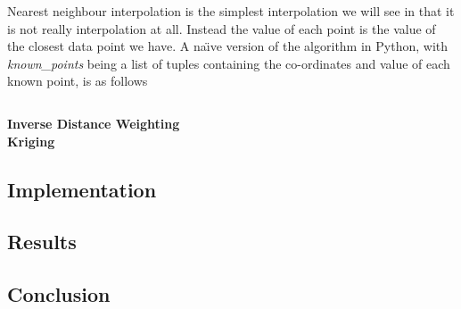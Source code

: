 				Nearest neighbour interpolation is the simplest interpolation we will see in that it is not really interpolation at all. Instead the value of each point is the value of the closest data point we have. A na\"{\i}ve version of the algorithm in Python, with \emph{known\_points} being a list of tuples containing the co-ordinates and value of each known point, is as follows\:

				\inputminted[mathescape,linenos,numbersep=5pt,frame=lines,framesep=2mm]{python}{./code/nearest_neighbour.py}

			\textbf{Inverse Distance Weighting}\label{datavalidation_inversedistanceweighting} \\

			\textbf{Kriging}\label{datavalidation_kriging} \\
		
	\subsection{Implementation}\label{datavalidation_implementation}
	\subsection{Results}\label{datavalidation_results}
	\subsection{Conclusion}\label{datavalidation_conclusion}
